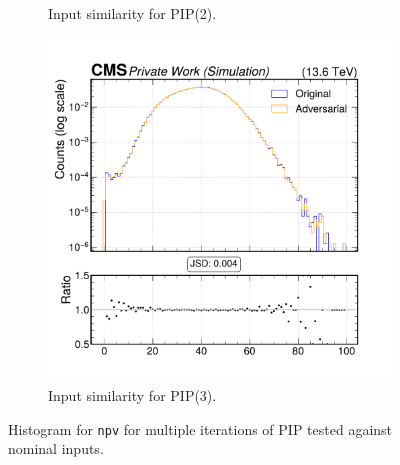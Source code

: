 \begin{figure}[h]
\begin{subfigure}[t]{0.32\textwidth}
    \caption{Input similarity for PIP(2).}
  \end{subfigure}\hfill
  \begin{subfigure}[t]{0.32\textwidth}
    \includegraphics[width=\linewidth]{media/output/features/compare/intprob_3/cmp_global_features_npv.pdf}
    \caption{Input similarity for PIP(3).}
  \end{subfigure}

  \caption{Histogram for \texttt{npv} for multiple iterations of PIP tested against nominal inputs.}
  \label{fig:intprob_input_npv}
\end{figure}
